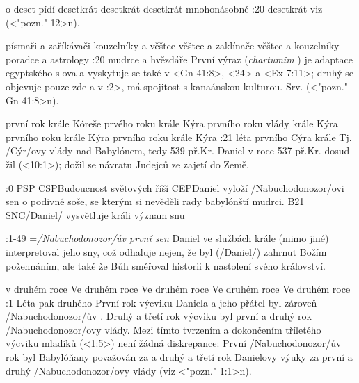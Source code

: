     {o deset pídí} %
    {desetkrát}  %
    {desetkrát} %
    {desetkrát}  %
    {mnohonásobně}  %
:20 {desetkrát} viz (<"pozn." 12>n).

    {písmaři a zaříkávači} %
    {kouzelníky a věštce}  %
    {věštce a zaklínače} %
    {věštce a kouzelníky}  %
    {poradce a astrology}  %
:20 {mudrce a hvězdáře} První výraz ({\it chartumim\/} \Chartumim ) 
je adaptace egyptského slova a  vyskytuje se také v <Gn 41:8>, <24> a <Ex 7:11>; druhý
se objevuje pouze zde a v :2>, má spojitost s kanaánskou kulturou. Srv. (<"pozn." Gn 41:8>n). 

    {první rok krále Kóreše} %
    {prvého roku krále Kýra}  %
    {prvního roku vlády krále Kýra} %
    {prvního roku krále Kýra}  %
    {prvního roku krále Kýra}  %
:21 {léta prvního Cýra krále} Tj. \x/Cýr/ovy vlády nad Babylónem, tedy 539 př.Kr. Daniel v roce 537 př.Kr. dosud žil (<10:1>); dožil se návratu Judejců ze zajetí do Země.

:0 {} 
% 
        {PSP}{}%
        {CSP}{Budoucnost světových říší}%
        {CEP}{Daniel vyloží \x/Nabuchodonozor/ovi sen o podivné soše, se
             kterým si nevěděli rady babylónští mudrci.}%
        {B21}{}%
        {SNC}{\x/Daniel/ vysvětluje králi význam snu} 

             

:1-49 {}={\it\x/Nabuchodonozor/ův první sen\/} Daniel ve službách krále (mimo jiné) interpretoval jeho sny, což odhaluje nejen, že  byl (\x/Daniel/) zahrnut Božím požehnáním, ale také že Bůh směřoval historii  k nastolení svého království.

    {v druhém roce} %
    {Ve druhém roce}  %
    {Ve druhém roce} %
    {Ve druhém roce}  %
    {Ve druhém roce}  %
:1 {Léta pak druhého} První rok výcviku Daniela a jeho přátel byl
zároveň \x/Nabuchodonozor/ův . Druhý a třetí rok výcviku byl první a druhý rok
\x/Nabuchodonozor/ovy vlády.  %
Mezi tímto tvrzením a dokončením tříletého výcviku mladíků (<1:5>) není žádná diskrepance: 
První  \x/Nabuchodonozor/ův rok byl Babylóňany považován za  a druhý a třetí rok Danielovy výuky za první a druhý  \x/Nabuchodonozor/ovy vlády (viz <"pozn." 1:1>n).

